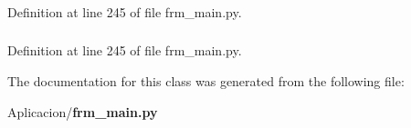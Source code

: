 \subsubsection[{v\-\_\-deb}]{}\label{class_aplicacion_1_1frm__main_1_1_proc_c_d_m_ad67ceb349235b172f12ab6c51fffa51c}


\-Definition at line 245 of file frm\-\_\-main.\-py.

\subsubsection[{v\-\_\-sat}]{}\label{class_aplicacion_1_1frm__main_1_1_proc_c_d_m_ab9af407588f41665563bfc941b3063b9}


\-Definition at line 245 of file frm\-\_\-main.\-py.



\-The documentation for this class was generated from the following file\-:\begin{DoxyCompactItemize}
\item 
\-Aplicacion/{\bf frm\-\_\-main.\-py}\end{DoxyCompactItemize}
